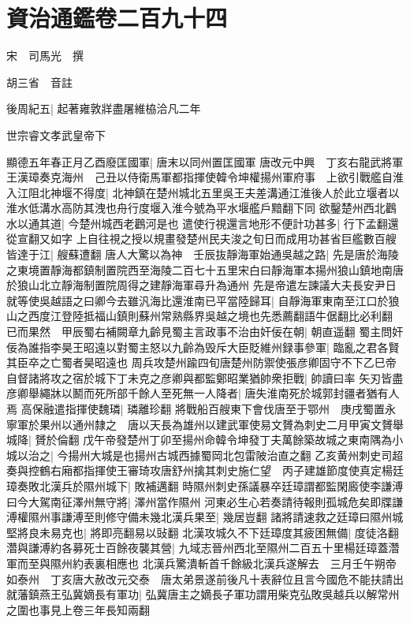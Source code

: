 \chapter{資治通鑑卷二百九十四}
宋　司馬光　撰

胡三省　音註

後周紀五|{
	起著雍敦牂盡屠維栛洽凡二年}


世宗睿文孝武皇帝下

顯德五年春正月乙酉廢匡國軍|{
	唐末以同州置匡國軍}
唐改元中興　丁亥右龍武將軍王漢璋奏克海州　己丑以侍衛馬軍都指揮使韓令坤權揚州軍府事　上欲引戰艦自淮入江阻北神堰不得度|{
	北神鎮在楚州城北五里吳王夫差溝通江淮後人於此立堰者以淮水低溝水高防其洩也舟行度堰入淮今號為平水堰艦戶黯翻下同}
欲鑿楚州西北鸛水以通其道|{
	今楚州城西老鸛河是也}
遣使行視還言地形不便計功甚多|{
	行下孟翻還從宣翻又如字}
上自往視之授以規畫發楚州民夫浚之旬日而成用功甚省巨艦數百艘皆達于江|{
	艘蘇遭翻}
唐人大驚以為神　壬辰抜靜海軍始通吳越之路|{
	先是唐於海陵之東境置靜海都鎮制置院西至海陵二百七十五里宋白曰靜海軍本揚州狼山鎮地南唐於狼山北立靜海制置院周得之建靜海軍尋升為通州}
先是帝遣左諫議大夫長安尹日就等使吳越語之曰卿今去雖汎海比還淮南已平當陸歸耳|{
	自靜海軍東南至江口於狼山之西度江登陸抵福山鎮則蘇州常熟縣界吳越之境也先悉薦翻語牛倨翻比必利翻}
已而果然　甲辰蜀右補闕章九齡見蜀主言政事不治由奸佞在朝|{
	朝直遥翻}
蜀主問奸佞為誰指李昊王昭遠以對蜀主怒以九齡為毁斥大臣貶維州録事參軍|{
	臨亂之君各賢其臣卒之亡蜀者昊昭遠也}
周兵攻楚州踰四旬唐楚州防禦使張彦卿固守不下乙巳帝自督諸將攻之宿於城下丁未克之彦卿與都監鄭昭業猶帥衆拒戰|{
	帥讀曰率}
矢刃皆盡彦卿舉繩牀以鬭而死所部千餘人至死無一人降者|{
	唐失淮南死於城郭封疆者猶有人焉}
高保融遣指揮使魏璘|{
	璘離珍翻}
將戰船百艘東下會伐唐至于鄂州　庚戌蜀置永寧軍於果州以通州隸之　唐以天長為雄州以建武軍使易文贇為刺史二月甲寅文贇舉城降|{
	贇於倫翻}
戊午帝發楚州丁卯至揚州命韓令坤發丁夫萬餘築故城之東南隅為小城以治之|{
	今揚州大城是也揚州古城西據蜀岡北包雷陂治直之翻}
乙亥黄州刺史司超奏與控鶴右廂都指揮使王審琦攻唐舒州擒其刺史施仁望　丙子建雄節度使真定楊廷璋奏敗北漢兵於隰州城下|{
	敗補邁翻}
時隰州刺史孫議暴卒廷璋謂都監閑廄使李謙溥曰今大駕南征澤州無守將|{
	澤州當作隰州}
河東必生心若奏請待報則孤城危矣即牒謙溥權隰州事謙溥至則修守備未幾北漢兵果至|{
	幾居豈翻}
諸將請速救之廷璋曰隰州城堅將良未易克也|{
	將即亮翻易以䜴翻}
北漢攻城久不下廷璋度其疲困無備|{
	度徒洛翻}
濳與謙溥約各募死士百餘夜襲其營|{
	九域志晉州西北至隰州二百五十里楊廷璋蓋濳軍而至與隰州約表裏相應也}
北漢兵驚潰斬首千餘級北漢兵遂解去　三月壬午朔帝如泰州　丁亥唐大赦改元交泰　唐太弟景遂前後凡十表辭位且言今國危不能扶請出就藩鎮燕王弘冀嫡長有軍功|{
	弘冀唐主之嫡長子軍功謂用柴克弘敗吳越兵以解常州之圍也事見上卷三年長知兩翻}
